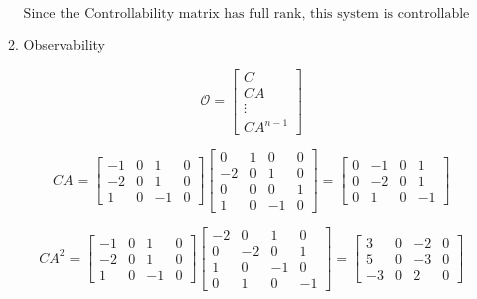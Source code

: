\documentclass{article}
\begin{document}
\begin{enumerate}[label=\alph*)]
\begin{enumerate}[label=\roman*)]
    $\boxed{\text{Since the Controllability matrix has full rank, this system is controllable}}$

    \item Observability
    
    \[
    \mathcal{O} = 
    \begin{bmatrix}
        C \\
        CA \\
        \vdots \\
        CA^{n-1}
    \end{bmatrix}
    \]

    \[
    CA = 
    \begin{bmatrix}
        -1 & 0 & 1 & 0 \\
        -2 & 0 & 1 & 0 \\
        1 & 0 & -1 & 0
    \end{bmatrix} 
    \begin{bmatrix}
        0 & 1 & 0 & 0 \\
        -2 & 0 & 1 & 0 \\
        0 & 0 & 0 & 1 \\
        1 & 0 & -1 & 0
    \end{bmatrix}
    =
    \begin{bmatrix}
        0 & -1 & 0 & 1 \\
        0 & -2 & 0 & 1 \\
        0 & 1 & 0 & -1
    \end{bmatrix}
    \]

    \[
    CA^2 = 
    \begin{bmatrix}
        -1 & 0 & 1 & 0 \\
        -2 & 0 & 1 & 0 \\
        1 & 0 & -1 & 0
    \end{bmatrix} 
    \begin{bmatrix}
        -2 & 0 & 1 & 0 \\
        0 & -2 & 0 & 1 \\
        1 & 0 & -1 & 0 \\
        0 & 1 & 0 & -1
    \end{bmatrix}
    =
    \begin{bmatrix}
        3 & 0 & -2 & 0 \\
        5 & 0 & -3 & 0 \\
        -3 & 0 & 2 & 0
    \end{bmatrix}
    \]


\end{enumerate}
\end{enumerate}
\end{document}
